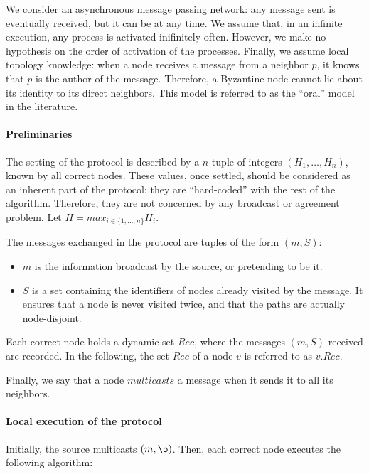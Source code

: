 \documentclass[a4paper,11pt]{article}
\begin{document}
We consider an asynchronous message passing network: any message sent is eventually received, but it can be at any time. We assume that, in an infinite execution, any process is activated inifinitely often. However, we make no hypothesis on the order of activation of the processes. Finally, we assume local topology knowledge: when a node receives a message from a neighbor $p$, it knows that $p$ is the author of the message. Therefore, a Byzantine node cannot lie about its identity to its direct neighbors. This model is referred to as the ``oral'' model in the literature.

\paragraph{Preliminaries}

The setting of the protocol is described by a $n$-tuple of integers $(H_1,\dots,H_n)$, known by all correct nodes. These values, once settled, should be considered as an inherent part of the protocol: they are ``hard-coded'' with the rest of the algorithm. Therefore, they are not concerned by any broadcast or agreement problem. Let $H = max_{i \in \{1,\dots,n\}} H_i$.

The messages exchanged in the protocol are tuples of the form $(m,S)$:
\begin{itemize}
\item $m$ is the information broadcast by the source, or pretending to be it.
\item $S$ is a set containing the identifiers of nodes already visited by the message. It ensures that a node is never visited twice, and that the paths are actually node-disjoint.
\end{itemize}
Each correct node holds a dynamic set $Rec$, where the messages $(m,S)$ received are recorded. In the following, the set $Rec$ of a node $v$ is referred to as $v.Rec$.

Finally, we say that a node $multicasts$ a message when it sends it to all its neighbors.

\paragraph{Local execution of the protocol}

Initially, the source multicasts $(m,\o)$. Then, each correct node executes the following algorithm:
\end{document}
